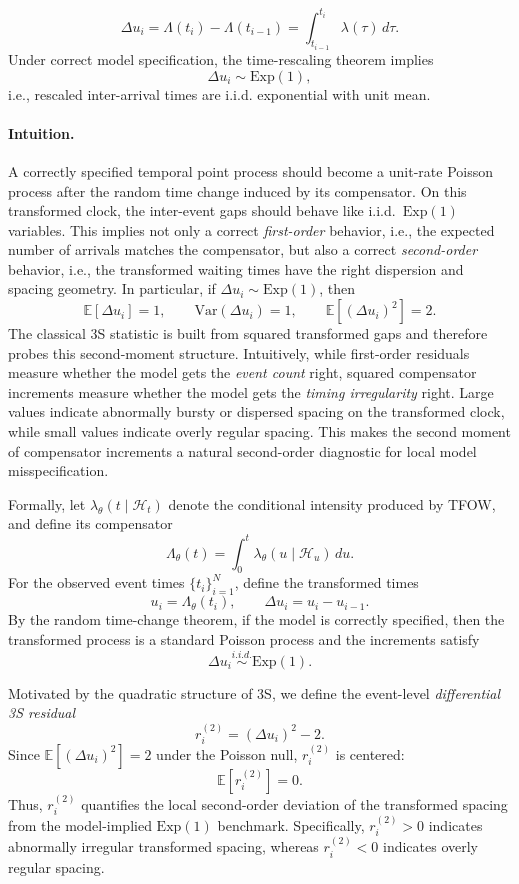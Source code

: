 %
\begin{equation}
\Delta u_i
=
\Lambda(t_i) - \Lambda(t_{i-1})
=
\int_{t_{i-1}}^{t_i} \lambda(\tau)\, d\tau.
\label{eq:delta_u2}
\end{equation}
%
Under correct model specification, the time-rescaling theorem implies
%
\[
\Delta u_i \sim \text{Exp}(1),
\]
%
i.e., rescaled inter-arrival times are i.i.d. exponential with unit mean.




\paragraph{Intuition.}
A correctly specified temporal point process should become a unit-rate Poisson process after the random time change induced by its compensator. On this transformed clock, the inter-event gaps should behave like i.i.d.\ $\mathrm{Exp}(1)$ variables. This implies not only a correct \emph{first-order} behavior, i.e., the expected number of arrivals matches the compensator, but also a correct \emph{second-order} behavior, i.e., the transformed waiting times have the right dispersion and spacing geometry. In particular, if $\Delta u_i \sim \mathrm{Exp}(1)$, then
\[
\mathbb{E}[\Delta u_i]=1,
\qquad
\mathrm{Var}(\Delta u_i)=1,
\qquad
\mathbb{E}[(\Delta u_i)^2]=2.
\]
The classical 3S statistic is built from squared transformed gaps and therefore probes this second-moment structure. Intuitively, while first-order residuals measure whether the model gets the \emph{event count} right, squared compensator increments measure whether the model gets the \emph{timing irregularity} right. Large values indicate abnormally bursty or dispersed spacing on the transformed clock, while small values indicate overly regular spacing. This makes the second moment of compensator increments a natural second-order diagnostic for local model misspecification.

Formally, let $\lambda_\theta(t \mid \mathcal{H}_t)$ denote the conditional intensity produced by TFOW, and define its compensator
\[
\Lambda_\theta(t)=\int_0^t \lambda_\theta(u \mid \mathcal{H}_u)\,du.
\]
For the observed event times $\{t_i\}_{i=1}^N$, define the transformed times
\[
u_i=\Lambda_\theta(t_i),
\qquad
\Delta u_i=u_i-u_{i-1}.
\]
By the random time-change theorem, if the model is correctly specified, then the transformed process is a standard Poisson process and the increments satisfy
\[
\Delta u_i \overset{i.i.d.}{\sim} \mathrm{Exp}(1).
\]

Motivated by the quadratic structure of 3S, we define the event-level \emph{differential 3S residual}
\[
r_i^{(2)} = (\Delta u_i)^2 - 2.
\]
Since $\mathbb{E}[(\Delta u_i)^2]=2$ under the Poisson null, $r_i^{(2)}$ is centered:
\[
\mathbb{E}[r_i^{(2)}]=0.
\]
Thus, $r_i^{(2)}$ quantifies the local second-order deviation of the transformed spacing from the model-implied $\mathrm{Exp}(1)$ benchmark. Specifically, $r_i^{(2)}>0$ indicates abnormally irregular transformed spacing, whereas $r_i^{(2)}<0$ indicates overly regular spacing.

